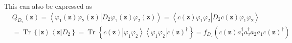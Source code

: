 \documentclass[aps,preprint]{revtex4}%
\begin{document}
This can also be expressed as
\begin{align}
&  Q_{D_{2}}\left(  \mathbf{z}\right)  =\left\langle \varphi_{1}\left(
\mathbf{z}\right)  \varphi_{2}\left(  \mathbf{z}\right)  \left\vert
D_{2}\varphi_{1}\left(  \mathbf{z}\right)  \varphi_{2}\left(  \mathbf{z}%
\right)  \right.  \right\rangle =\left\langle c\left(  \mathbf{z}\right)
\varphi_{1}\varphi_{2}\left\vert D_{2}c\left(  \mathbf{z}\right)  \varphi
_{1}\varphi_{2}\right.  \right\rangle \nonumber\\
&  =\operatorname*{Tr}\left\{  \left\vert \mathbf{z}\right\rangle \left\langle
\mathbf{z}\right\vert D_{2}\right\}  =\operatorname*{Tr}\left\{  c\left(
\mathbf{z}\right)  \left\vert \varphi_{1}\varphi_{2}\right\rangle \left\langle
\varphi_{1}\varphi_{2}\right\vert c\left(  \mathbf{z}\right)  ^{\dagger
}\right\}  =f_{D_{2}}\left(  c\left(  \mathbf{z}\right)  a_{1}^{\dagger}%
a_{2}^{\dagger}a_{2}a_{1}c\left(  \mathbf{z}\right)  ^{\dagger}\right)
\end{align}
\end{document}
